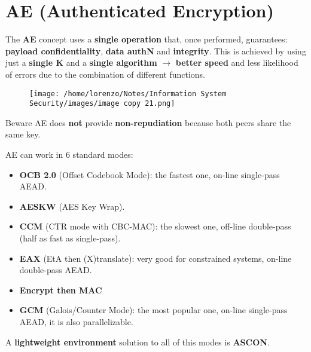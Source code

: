 \section{AE (Authenticated Encryption)}

The \textbf{AE} concept uses a \textbf{single operation} that, once performed, guarantees: \textbf{payload confidentiality}, \textbf{data authN} and \textbf{integrity}. This is achieved by using just a \textbf{single K} and a
\textbf{single algorithm} \(\rightarrow \)  \textbf{better speed} and less likelihood of errors due to the combination of different functions. 
\begin{figure}[H]
    \centering
    \texttt{[image: /home/lorenzo/Notes/Information System Security/images/image copy 21.png]}
\end{figure}
\begin{quotebox-red}{Beware}
    AE does \textbf{not} provide \textbf{non-repudiation} because both peers share the same key.
\end{quotebox-red}
\vspace{0.1cm}
\noindent
AE can work in 6 standard modes:
\begin{itemize}
    \item \textbf{OCB 2.0} (Offset Codebook Mode): the fastest one, on-line single-pass AEAD.
    \item \textbf{AESKW} (AES Key Wrap).
    \item \textbf{CCM} (CTR mode with CBC-MAC): the slowest one, off-line double-pass (half as fast as
    single-pass).
    \item \textbf{EAX} (EtA then (X)translate): very good for constrained systems, on-line double-pass
    AEAD.
    \item \textbf{Encrypt then MAC}
    \item \textbf{GCM} (Galois/Counter Mode): the most popular one, on-line single-pass AEAD, it is
    also parallelizable.
\end{itemize}
A \textbf{lightweight environment} solution to all of this modes is \textbf{ASCON}.
\vspace{0.2cm}
